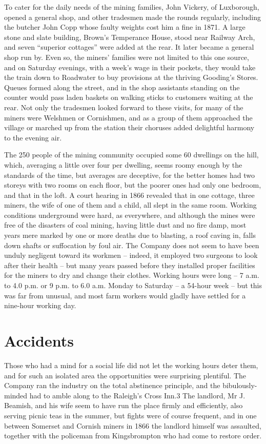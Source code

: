 \documentclass[11pt]{book}
\begin{document}
To cater for the daily needs of the mining families, John Vickery, of Luxborough, opened a general shop, and other tradesmen made the rounds regularly, including the butcher John Copp whose faulty weights cost him a fine in 1871.  A large stone and slate building, Brown’s Temperance House, stood near Railway Arch, and seven “superior cottages” were added at the rear. It later became a general shop run by. Even so, the miners’ families were not limited to this one source, and on Saturday evenings, with a week’s wage in their pockets, they would take the train down to Roadwater to buy provisions at the thriving Gooding’s Stores. Queues formed along the street, and in the shop assistants standing on the counter would pass laden baskets on walking sticks to customers waiting at the rear. Not only the tradesmen looked forward to these visits, for many of the miners were Welshmen or Cornishmen, and as a group of them approached the village or marched up from the station their choruses added  delightful harmony to the evening air.  

The 250 people of the mining community occupied some 60 dwellings on the hill, which, averaging a little over four per dwelling, seems roomy enough by the standards of the time, but averages are deceptive, for the better homes had two storeys with two rooms on each floor, but the poorer ones had only one bedroom, and that in the loft.  A court hearing in 1866 revealed that in one cottage, three miners, the wife of one of them and a child, all slept in the same room.     Working conditions underground were hard, as everywhere, and although the mines were free of the disasters of coal mining, having little dust and no fire damp, most years mere marked by one or more deaths due to blasting, a roof caving in, falls down shafts or suffocation by foul air. The Company does not seem to have been unduly negligent toward its workmen – indeed, it employed two surgeons to look after their health – but many years passed before they installed proper facilities for the miners to dry and change their clothes. Working hours were long – 7 a.m. to 4.0 p.m. or 9 p.m. to 6.0 a.m.  Monday    to Saturday – a 54-hour week – but this was far from unusual, and most farm workers would gladly have settled for a nine-hour working day.

\chapter{Accidents}

Those who had a mind for a social life did not let the working hours deter them, and for such an isolated area the opportunities were surprising plentiful. The Company ran the industry on the total abstinence principle, and the bibulously-minded had to amble along to the Raleigh’s Cross Inn.3 The landlord, Mr J. Beamish, and his wife seem to have run the place firmly and efficiently, also serving picnic teas in the summer, but fights were of course frequent, and in one between Somerset and Cornish miners in 1866 the landlord himself was assaulted, together with the policeman from Kingsbrompton who had come to restore order.
\end{document}
